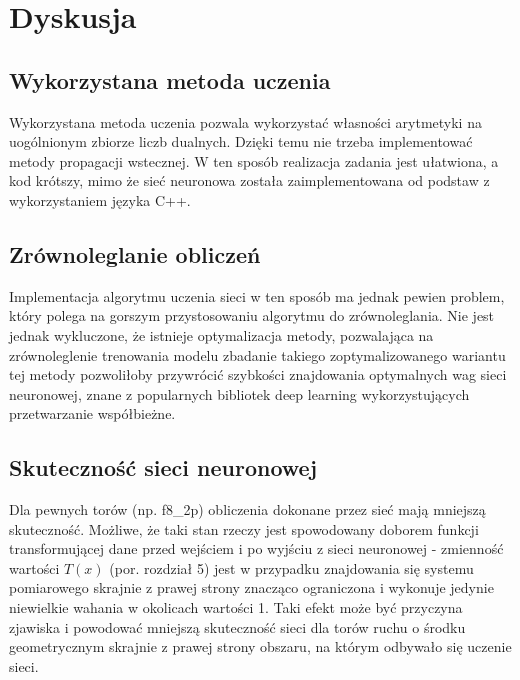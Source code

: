 \documentclass{classrep}
\begin{document}
\section{Dyskusja}
{
\subsection{Wykorzystana metoda uczenia}{
	Wykorzystana metoda uczenia pozwala wykorzystać własności arytmetyki na uogólnionym zbiorze liczb dualnych. Dzięki temu nie trzeba implementować metody propagacji wstecznej. W ten sposób realizacja zadania jest ułatwiona, a kod \ppauza krótszy, mimo że sieć neuronowa została zaimplementowana od podstaw z wykorzystaniem języka C++.
\subsection{Zrównoleglanie obliczeń}{
	Implementacja algorytmu uczenia sieci w ten sposób ma jednak pewien problem, który polega na gorszym przystosowaniu algorytmu do zrównoleglania. Nie jest jednak wykluczone, że istnieje optymalizacja metody, pozwalająca na zrównoleglenie trenowania modelu \ppauza zbadanie takiego zoptymalizowanego wariantu tej metody pozwoliłoby przywrócić szybkości znajdowania optymalnych wag sieci neuronowej, znane z popularnych bibliotek deep learning wykorzystujących przetwarzanie współbieżne. 
}
\subsection{Skuteczność sieci neuronowej}
	Dla pewnych torów (np. f8\_2p) obliczenia dokonane przez sieć mają mniejszą skuteczność. Możliwe, że taki stan rzeczy jest spowodowany doborem funkcji transformującej dane przed wejściem i po wyjściu z sieci neuronowej - zmienność wartości $T(x)$ (por. rozdział 5) jest w przypadku znajdowania się systemu pomiarowego skrajnie z prawej strony znacząco ograniczona i wykonuje jedynie niewielkie wahania w okolicach wartości 1. Taki efekt może być przyczyna zjawiska i powodować mniejszą skuteczność sieci dla torów ruchu o środku geometrycznym skrajnie z prawej strony obszaru, na którym odbywało się uczenie sieci.
}

}
\end{document}
